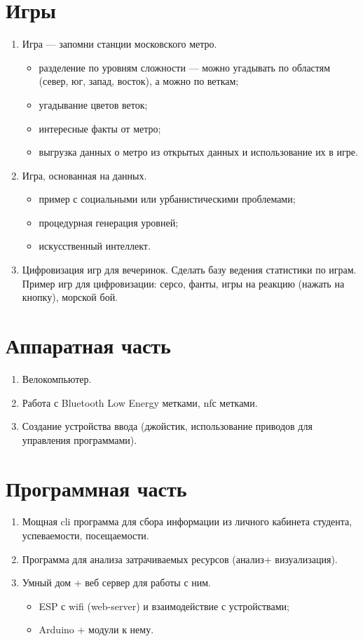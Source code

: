 \documentclass[a4paper,12pt]{article} %
\begin{document}
\section*{Игры}
\begin{enumerate}
	\item Игра --- запомни станции московского метро.
	\begin{itemize}
		\item разделение по уровням сложности --- можно угадывать по областям (север, юг, запад, восток), а можно по веткам;
		\item угадывание цветов веток;
		\item интересные факты от метро;
		\item выгрузка данных о метро из открытых данных и использование их в игре.
	\end{itemize}
	\item Игра, основанная на данных.
	\begin{itemize}
		\item пример с социальными или урбанистическими проблемами;
		\item процедурная генерация уровней;
		\item искусственный интеллект.
	\end{itemize}
	\item Цифровизация игр для вечеринок. Сделать базу ведения статистики по играм. Пример игр для цифровизации: серсо, фанты, игры на реакцию (нажать на кнопку), морской бой.
\end{enumerate}

\section*{Аппаратная часть}
\begin{enumerate}
	\item Велокомпьютер.
	\item Работа с Bluetooth Low Energy метками, nfс метками.
	\item Создание устройства ввода (джойстик, использование приводов для управления программами). 
\end{enumerate}


\section*{Программная часть}
\begin{enumerate}
	\item Мощная cli программа для сбора информации из личного кабинета студента, успеваемости, посещаемости.
	\item Программа для анализа затрачиваемых ресурсов (анализ+ визуализация).
	\item Умный дом + веб сервер для работы с ним.
		\begin{itemize}
			\item ESP с wifi (web-server) и взаимодействие с устройствами;
			\item Arduino + модули к нему.
		\end{itemize}
\end{enumerate}
\end{document}
